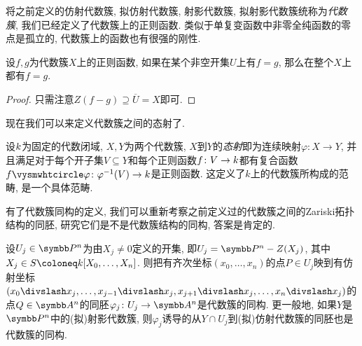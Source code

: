 将之前定义的仿射代数簇, 拟仿射代数簇, 射影代数簇, 拟射影代数簇统称为\emph{代数簇}, 我们已经定义了代数簇上的正则函数. 类似于单复变函数中非零全纯函数的零点是孤立的, 代数簇上的函数也有很强的刚性.

\begin{proposition}\label{prop:regularstiffness}
  设$f, g$为代数簇$X$上的正则函数, 如果在某个非空开集$U$上有$f=g$, 那么在整个$X$上都有$f=g$.
\end{proposition}

\begin{proof}
  只需注意$Z(f-g)\supseteq \overline{U}=X$即可.
\end{proof}

现在我们可以来定义代数簇之间的态射了.

\begin{definition}
  设$k$为固定的代数闭域, $X, Y$为两个代数簇, $X$到$Y$的\emph{态射}即为连续映射$\varphi\colon X\to Y$, 并且满足对于每个开子集$V\subseteq Y$和每个正则函数$f\colon V\to k$都有复合函数$f\composite\varphi\colon\varphi^{-1}(V)\to \kk$是正则函数. 这定义了$k$上的代数簇所构成的范畴, 是一个具体范畴.
\end{definition}

有了代数簇同构的定义, 我们可以重新考察之前定义过的代数簇之间的Zariski拓扑结构的同胚, 研究它们是不是代数簇结构的同构, 答案是肯定的.

\begin{proposition}\label{prop:projectiveopencoverisomorphism}
  设$U_j\in \PP^n$为由$X_j\neq 0$定义的开集, 即$U_j=\PP^n - Z(X_j)$, 其中$X_j\in S\coloneq \kk [X_0, \dotsc, X_n]$. 则把有齐次坐标$(x_0, \dotsc, x_n)$的点$P\in U_j$映到有仿射坐标$(x_0{\divslash}x_j,\linebreak[0] \dotsc, x_{j-1}{\divslash}x_j,\linebreak[0] x_{j+1}{\divslash}x_j, \dotsc,  x_n{\divslash}x_j)$的点$Q\in \AF^n$的同胚$\varphi_j\colon U_j\to \AF^n$是代数簇的同构. 更一般地, 如果$Y$是$\PP^n$中的(拟)射影代数簇, 则$\varphi_j$诱导的从$Y\cap U_j$到(拟)仿射代数簇的同胚也是代数簇的同构.
\end{proposition}

